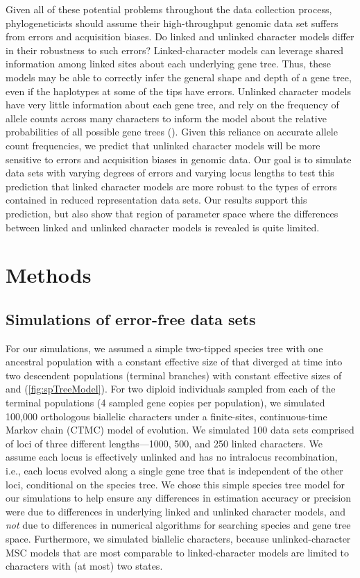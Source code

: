 Given all of these potential problems throughout the data collection process,
phylogeneticists should assume their high-throughput genomic data set suffers
from errors and acquisition biases.
Do linked and unlinked character models differ in their robustness to such
errors?
Linked-character models can leverage shared information among linked sites
about each underlying gene tree.
Thus, these models may be able to correctly infer the general shape and depth
of a gene tree, even if the haplotypes at some of the tips have errors.
Unlinked character models have very little information about each gene tree,
and rely on the frequency of allele counts across many characters to inform the
model about the relative probabilities of all possible gene trees
().
Given this reliance on accurate allele count frequencies, we predict that
unlinked character models will be more sensitive to errors and acquisition
biases in genomic data.
Our goal is to simulate data sets with varying degrees of errors and varying 
locus lengths to test this prediction that linked character models are more 
robust to the types of errors contained in reduced representation data sets.
Our results support this prediction, but also show that region of parameter
space where the differences between linked and unlinked character models is
revealed is quite limited.


\section{Methods}

\subsection{Simulations of error-free data sets}
For our simulations, we assumed a simple two-tipped species tree with one 
ancestral population with a constant effective size of \rootpopsize that 
diverged at time \divtime into two descendent populations (terminal branches) 
with constant effective sizes of \tippopsize[1] and \tippopsize[2] (\cref{fig:spTreeModel}).
For two diploid individuals sampled from each of the terminal
populations (4 sampled gene copies per population),
we simulated 100,000 orthologous biallelic characters under a finite-sites,
continuous-time Markov chain (CTMC) model of evolution.
We simulated 100 data sets comprised of loci of three different lengths---1000,
500, and 250 linked characters.
We assume each locus is effectively unlinked and has no intralocus
recombination, i.e., each locus evolved along a single gene tree that is
independent of the other loci, conditional on the species tree.
We chose this simple species tree model for our simulations to help ensure any
differences in estimation accuracy or precision were due to differences in
underlying linked and unlinked character models,
and \emph{not} due to differences in numerical algorithms for searching species
and gene tree space.
Furthermore, we simulated biallelic characters, because unlinked-character MSC
models
\citep{bryantInferringSpeciesTrees2012,Oaks2018ecoevolity}
that are most comparable to linked-character models
\citep{Heled2010,ogilvieStarBEAST2BringsFaster2017}
are limited to characters with (at most) two states.

